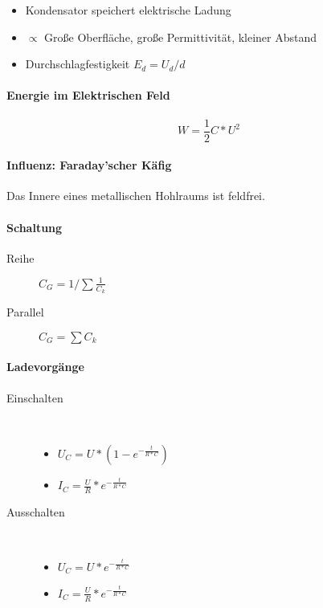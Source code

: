 \begin{itemize}
  \item Kondensator speichert elektrische Ladung
  \item $\propto$ Gro\ss e Oberfläche, gro\ss e Permittivität, kleiner Abstand
  \item Durchschlagfestigkeit $E_d = U_d / d$
\end{itemize}

\paragraph{Energie im Elektrischen Feld}

$$W = \frac{1}{2} C * U^2$$

\paragraph{Influenz: Faraday'scher Käfig}
Das Innere eines metallischen Hohlraums ist feldfrei.

\paragraph{Schaltung}

\begin{description}
  \item[Reihe] $C_G = 1/{\sum \frac{1}{C_k}}$
  \item[Parallel] $C_G = \sum C_k$
\end{description}

\paragraph{Ladevorgänge}

\begin{description}
  \item[Einschalten]\
  \begin{itemize}
    \item $U_C = U * (1 - e^{- \frac{t}{R * C}})$
    \item $I_C = \frac{U}{R} * e^{- \frac{t}{R * C}}$
  \end{itemize}

  \item[Ausschalten]\
  \begin{itemize}
    \item $U_C = U * e^{- \frac{t}{R * C}}$
    \item $I_C = \frac{U}{R} * e^{- \frac{t}{R * C}}$
  \end{itemize}
\end{description}

